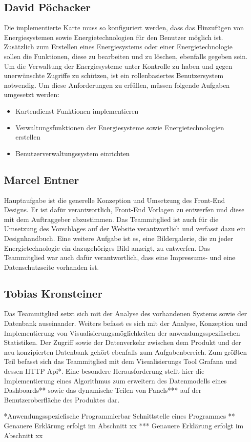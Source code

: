 \subsection{David Pöchacker}
Die implementierte Karte muss so konfiguriert werden, dass das Hinzufügen von Energiesystemen sowie Energietechnologien für den Benutzer möglich ist. Zusätzlich zum Erstellen eines Energiesystems oder einer Energietechnologie sollen die Funktionen, diese zu bearbeiten und zu löschen, ebenfalls gegeben sein. Um die Verwaltung der Energiesysteme unter Kontrolle zu haben und gegen unerwünschte Zugriffe zu schützen, ist ein rollenbasiertes Benutzersystem notwendig. Um diese Anforderungen zu erfüllen, müssen folgende Aufgaben umgesetzt werden:
\begin{itemize}
	\item Kartendienst Funktionen implementieren
	\item Verwaltungsfunktionen der Energiesysteme sowie Energietechnologien erstellen
	\item Benutzerverwaltungssystem einrichten
\end{itemize}



\subsection{Marcel Entner}
Hauptaufgabe ist die generelle Konzeption und Umsetzung des Front-End Designs. Er ist dafür verantwortlich, Front-End Vorlagen zu entwerfen und diese mit dem Auftraggeber abzustimmen. Das Teammitglied ist auch für die Umsetzung des Vorschlages auf der Website verantwortlich und verfasst dazu ein Designhandbuch. Eine weitere Aufgabe ist es, eine Bildergalerie, die zu jeder Energietechnologie ein dazugehöriges Bild anzeigt, zu entwerfen. Das Teammitglied  war auch dafür verantwortlich, dass eine Impressums- und eine Datenschutzseite vorhanden ist. 

\subsection{Tobias Kronsteiner}
Das Teammitglied setzt sich mit der Analyse des vorhandenen Systems sowie der Datenbank auseinander. Weiters befasst es sich mit der Analyse, Konzeption und Implementierung von Visualisierungsmöglichkeiten der anwendungsspezifischen Statistiken. Der Zugriff sowie der Datenverkehr zwischen dem Produkt und der neu konzipierten Datenbank gehört ebenfalls zum Aufgabenbereich. Zum größten Teil befasst sich das Teammitglied mit dem Visualisierungs Tool Grafana und dessen HTTP Api*. Eine besondere Herausforderung stellt hier die Implementierung eines Algorithmus zum erweitern des Datenmodells eines Dashboards** sowie das dynamische Teilen von Panels*** auf der Benutzeroberfläche des Produktes dar. 

*Anwendungsspeziefische Programmierbar Schnittstelle eines Programmes
** Genauere Erklärung erfolgt im Abschnitt xx
*** Genauere Erklärung erfolgt im Abschnitt xx

